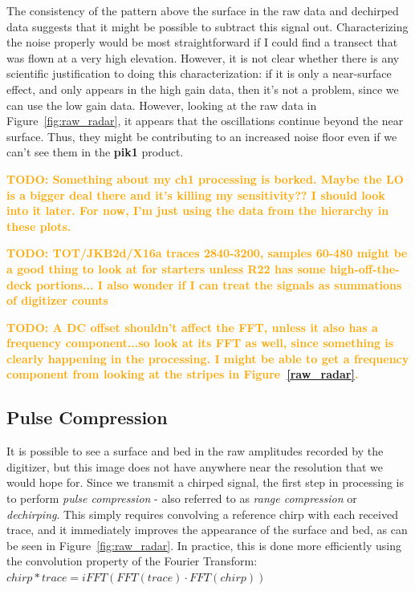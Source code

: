 \documentclass[11pt]{article}
\newcommand{\future}[1]{\ifthenelse{\boolean{include-future}} {\textcolor{Orange}{\textbf{TODO: #1}}}{}}
\newcommand{\figref}[1]{Figure~\ref{#1}}
\begin{document}
The consistency of the pattern above the surface in the raw data and dechirped data suggests that it might be possible to subtract this signal out. Characterizing the noise properly would be most straightforward if I could find a transect that was flown at a very high elevation. However, it is not clear whether there is any scientific justification to doing this characterization: if it is only a near-surface effect, and only appears in the high gain data, then it's not a problem, since we can use the low gain data. However, looking at the raw data in \figref{fig:raw_radar}, it appears that the oscillations continue beyond the near surface. Thus, they might be contributing to an increased noise floor even if we can't see them in the \textbf{pik1} product. 

\future{Something about my ch1 processing is borked. Maybe the LO is a bigger deal there and it's killing my sensitivity?? I should look into it later. For now, I'm just using the data from the hierarchy in these plots.}

\future{TOT/JKB2d/X16a traces 2840-3200, samples 60-480 might be a good thing to look at for starters unless R22 has some high-off-the-deck portions... I also wonder if I can treat the signals as summations of digitizer counts}

\future{A DC offset shouldn't affect the FFT, unless it also has a frequency component...so look at its FFT as well, since something is clearly happening in the processing. I might be able to get a frequency component from looking at the stripes in \figref{raw_radar}.}


\subsection{Pulse Compression}

It is possible to see a surface and bed in the raw amplitudes recorded by the digitizer, but this image does not have anywhere near the resolution that we would hope for. 
Since we transmit a chirped signal, the first step in processing is to perform \emph{pulse compression} - also referred to as \emph{range compression} or \emph{dechirping}.
This simply requires convolving a reference chirp with each received trace, and it immediately improves the appearance of the surface and bed, as can be seen in  \figref{fig:raw_radar}.
In practice, this is done more efficiently using the convolution property of the Fourier Transform: 
$chirp \ast trace = iFFT(FFT(trace) \cdot FFT(chirp))$
\end{document}
